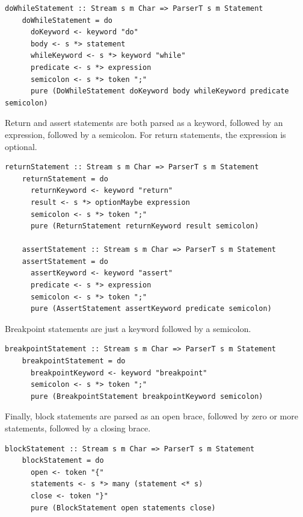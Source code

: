 \documentclass[UdineBachThesis,american,11pt]{PhdThesis}
\begin{document}
  \newpage

  \begin{lstlisting}[gobble=4,basicstyle=\ttfamily\small]
    doWhileStatement :: Stream s m Char => ParserT s m Statement
    doWhileStatement = do
      doKeyword <- keyword "do"
      body <- s *> statement
      whileKeyword <- s *> keyword "while"
      predicate <- s *> expression
      semicolon <- s *> token ";"
      pure (DoWhileStatement doKeyword body whileKeyword predicate semicolon)
  \end{lstlisting}

  Return and assert statements are both parsed as a keyword, followed by an
  expression, followed by a semicolon. For return statements, the expression is
  optional.

  \begin{lstlisting}[gobble=4,basicstyle=\ttfamily\small]
    returnStatement :: Stream s m Char => ParserT s m Statement
    returnStatement = do
      returnKeyword <- keyword "return"
      result <- s *> optionMaybe expression
      semicolon <- s *> token ";"
      pure (ReturnStatement returnKeyword result semicolon)

    assertStatement :: Stream s m Char => ParserT s m Statement
    assertStatement = do
      assertKeyword <- keyword "assert"
      predicate <- s *> expression
      semicolon <- s *> token ";"
      pure (AssertStatement assertKeyword predicate semicolon)
  \end{lstlisting}

  Breakpoint statements are just a \lstinline@breakpoint@ keyword followed by a
  semicolon.

  \begin{lstlisting}[gobble=4,basicstyle=\ttfamily\small]
    breakpointStatement :: Stream s m Char => ParserT s m Statement
    breakpointStatement = do
      breakpointKeyword <- keyword "breakpoint"
      semicolon <- s *> token ";"
      pure (BreakpointStatement breakpointKeyword semicolon)
  \end{lstlisting}

  Finally, block statements are parsed as an open brace, followed by zero or
  more statements, followed by a closing brace.

  \begin{lstlisting}[gobble=4,basicstyle=\ttfamily\small]
    blockStatement :: Stream s m Char => ParserT s m Statement
    blockStatement = do
      open <- token "{"
      statements <- s *> many (statement <* s)
      close <- token "}"
      pure (BlockStatement open statements close)
  \end{lstlisting}
\end{document}
